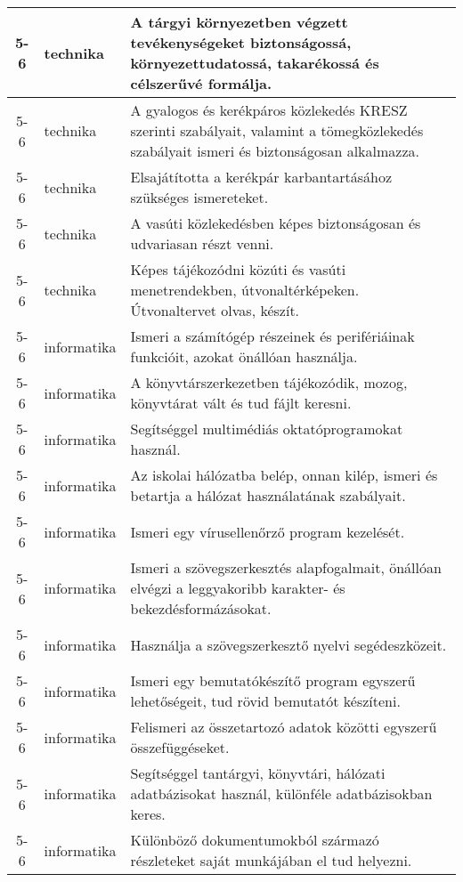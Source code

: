 \begin{small}
\begin{longtable}{c | p{2cm} |  p{11cm} }
              5-6 & technika & A tárgyi környezetben végzett tevékenységeket biztonságossá, környezettudatossá, takarékossá és célszerűvé formálja. \\ \hline
              5-6 & technika & A gyalogos és kerékpáros közlekedés KRESZ szerinti szabályait, valamint a tömegközlekedés szabályait ismeri és biztonságosan alkalmazza. \\ \hline
              5-6 & technika & Elsajátította a kerékpár karbantartásához szükséges ismereteket. \\ \hline
              5-6 & technika & A vasúti közlekedésben képes biztonságosan és udvariasan részt venni. \\ \hline
              5-6 & technika & Képes tájékozódni közúti és vasúti menetrendekben, útvonaltérképeken. Útvonaltervet olvas, készít. \\ \hline
              5-6 & informatika & Ismeri a számítógép részeinek és perifériáinak funkcióit, azokat önállóan használja. \\ \hline
              5-6 & informatika & A könyvtárszerkezetben tájékozódik, mozog, könyvtárat vált és tud fájlt keresni. \\ \hline
              5-6 & informatika & Segítséggel multimédiás oktatóprogramokat használ. \\ \hline
              5-6 & informatika & Az iskolai hálózatba belép, onnan kilép, ismeri és betartja a hálózat használatának szabályait. \\ \hline
              5-6 & informatika & Ismeri egy vírusellenőrző program kezelését. \\ \hline
              5-6 & informatika & Ismeri a szövegszerkesztés alapfogalmait, önállóan elvégzi a leggyakoribb karakter- és bekezdésformázásokat. \\ \hline
              5-6 & informatika & Használja a szövegszerkesztő nyelvi segédeszközeit. \\ \hline
              5-6 & informatika & Ismeri egy bemutatókészítő program egyszerű lehetőségeit, tud rövid bemutatót készíteni. \\ \hline
              5-6 & informatika & Felismeri az összetartozó adatok közötti egyszerű összefüggéseket. \\ \hline
              5-6 & informatika & Segítséggel tantárgyi, könyvtári, hálózati adatbázisokat használ, különféle adatbázisokban keres. \\ \hline
              5-6 & informatika & Különböző dokumentumokból származó részleteket saját munkájában el tud helyezni. \\ \hline

\end{longtable}
\end{small}
